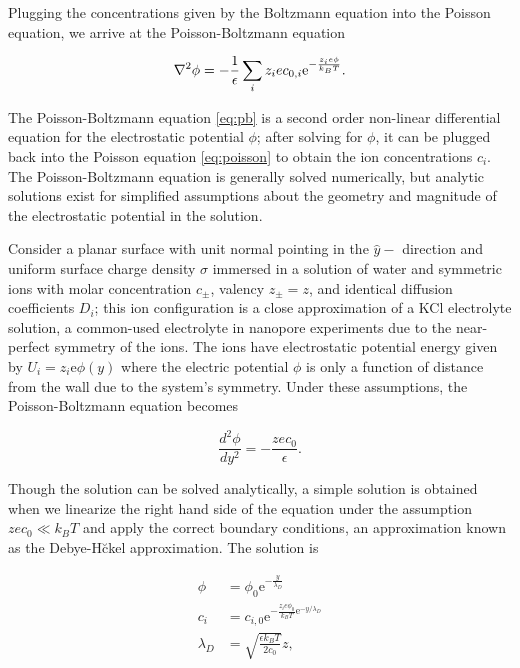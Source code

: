 			Plugging the concentrations given by the Boltzmann equation into the Poisson equation, we arrive at the Poisson-Boltzmann equation
			
			\begin{equation} \label{eq:pb}
				\mathbf{\nabla}^{2}\phi=-\frac{1}{\epsilon}\sum_{i}z_{i}ec_{0,i}\mathrm{e}^{-\frac{z_{i}e\phi}{k_{B}T}}.
			\end{equation}
			
			The Poisson-Boltzmann equation \ref{eq:pb} is a second order non-linear differential equation for the electrostatic potential $\phi$; after solving for $\phi$, it can be plugged back into the Poisson equation \ref{eq:poisson} to obtain the ion concentrations $c_{i}$. The Poisson-Boltzmann equation is generally solved numerically, but analytic solutions exist for simplified assumptions about the geometry and magnitude of the electrostatic potential in the solution. 
			
			Consider a planar surface with unit normal pointing in the $\hat{y}-$ direction and uniform surface charge density $\sigma$ immersed in a solution of water and symmetric ions with molar concentration $c_{\pm}$, valency $z_{\pm}=z$, and identical diffusion coefficients $D_{i}$; this ion configuration is a close approximation of a KCl electrolyte solution, a common-used electrolyte in nanopore experiments due to the near-perfect symmetry of the ions. The ions have electrostatic potential energy given by $U_{i}=z_{i}\mathrm{e}\phi\left(y\right)$ where the electric potential $\phi$ is only a function of distance from the wall due to the system's symmetry. Under these assumptions, the Poisson-Boltzmann equation becomes
			
			\[ \frac{d^{2}\phi}{dy^{2}}=-\frac{zec_{0}}{\epsilon}. \]
			
			Though the solution can be solved analytically, a simple solution is obtained when we linearize the right hand side of the equation under the assumption $zec_{0}\ll k_{B}T$ and apply the correct boundary conditions, an approximation known as the Debye-H\u ckel approximation. The solution is
			
			\begin{equation} \label{eq:pb1d}
				\begin{split}
					\phi &= \phi_{0}\mathrm{e}^{-\frac{y}{\lambda_{D}}} \\
					c_{i} &= c_{i,0}\mathrm{e}^{-\frac{z_{i}e\phi_{0}}{k_{B}T}\mathrm{e}^{-y/\lambda_{D}}} \\
					\lambda_{D} &= \sqrt{\frac{\epsilon k_{B}T}{2c_{0}}}z,
				\end{split}
			\end{equation}
			
